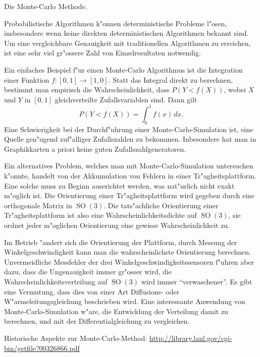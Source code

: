 \begin{aufgabe}
Die Monte-Carlo Methode.
\end{aufgabe}

Probabilistische Algorithmen k"onnen deterministische Probleme l"osen,
insbesondere wenn keine direkten deterministischen Algorithmen bekannt 
sind.
Um eine vergleichbare Genauigkeit mit traditionellen Algorithmen zu
erreichen, ist eine sehr viel gr"ossere Zahl von Einzelresultaten notwendig.

Ein einfaches Beispiel f"ur einen Monte-Carlo Algorithmus ist die Integration
einer Funktion $f\colon[0,1]\to[1,0]$.
Statt das Integral direkt zu berechnen,
bestimmt man empirisch die Wahrscheinlichkeit, dass $P(Y < f(X))$, wobei
$X$ und $Y$ in $[0,1]$ gleichverteilte Zufallsvariablen sind. Dann gilt
\[
P(Y<f(X)) = \int_0^1f(x)\,dx.
\]
Eine Schwierigkeit bei der Durchf"uhrung einer Monte-Carlo-Simulation
ist, eine Quelle gen"ugend zuf"alliger Zufallszahlen zu bekommen.
Inbesondere hat man in Graphikkarten a priori keine guten
Zufallszahlgeneratoren. 

Ein alternatives Problem, welches man mit Monte-Carlo-Simulation untersuchen
k"onnte, handelt von der Akkumulation von Fehlern in einer Tr"agheitsplattform.
Eine solche muss zu Beginn auserichtet werden, was nat"urlich nicht
exakt m"oglich ist. Die Orientierung einer Tr"agheitsplattform wird gegeben
durch eine orthogonale Matrix in $\operatorname{SO}(3)$. 
Die tats"achliche Orientierung einer Tr"agheitsplattform ist also eine
Wahrscheinlichkeitsdichte auf $\operatorname{SO}(3)$, sie ordnet jeder m"oglichen
Orientierung eine gewisse Wahrscheinlichkeit zu.

Im Betrieb "andert sich die Orientierung der Plattform, durch Messung
der Winkelgeschwindigkeit kann man die wahrscheinlichste Orientierung
berechnen.
Unvermeidliche Messfehler der drei Winkelgeschwindigkeitssensoren
f"uhren aber dazu, dass die Ungenauigkeit immer gr"osser wird, die
Wahrscheinlichkeitsverteilung auf $\operatorname{SO}(3)$ wird immer ``verwaschener''.
Es gibt eine Vermutung, dass dies von einer Art Diffusions- oder
W"armeleitungsgleichung beschrieben wird.
Eine interessante Anwendung von Monte-Carlo-Simulation w"are, die
Entwicklung der Verteilung damit zu berechnen, und mit der 
Differentialgleichung zu vergleichen.

Historische Aspekte zur Monte-Carlo-Method:
\url{http://library.lanl.gov/cgi-bin/getfile?00326866.pdf}
